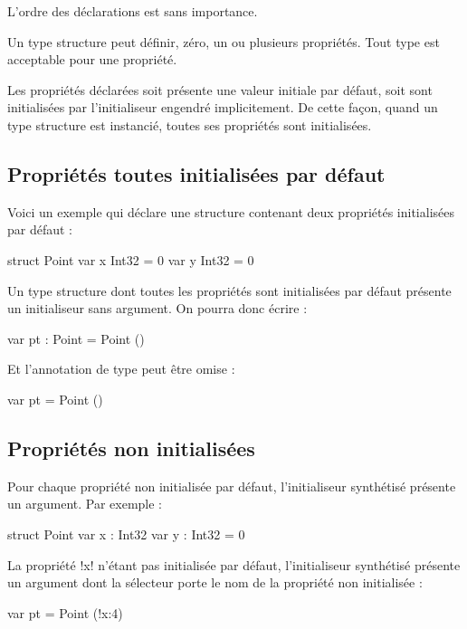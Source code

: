 L'ordre des déclarations est sans importance.











Un type structure peut définir, zéro, un ou plusieurs propriétés. Tout type est acceptable pour une propriété.

Les propriétés déclarées soit présente une valeur initiale par défaut, soit sont initialisées par l'initialiseur engendré implicitement. De cette façon, quand un type structure est instancié, toutes ses propriétés sont initialisées.

\subsection{Propriétés toutes initialisées par défaut}

Voici un exemple qui déclare une structure contenant deux propriétés initialisées par défaut :

\begin{OMNIBUS}
struct Point {
  var x Int32 = 0
  var y Int32 = 0
}
\end{OMNIBUS}

Un type structure dont toutes les propriétés sont initialisées par défaut présente un initialiseur sans argument. On pourra donc écrire :
\begin{OMNIBUS}
var pt : Point = Point ()
\end{OMNIBUS}

Et l'annotation de type peut être omise :
\begin{OMNIBUS}
var pt = Point ()
\end{OMNIBUS}

\subsection{Propriétés non initialisées}

Pour chaque propriété non initialisée par défaut, l'initialiseur synthétisé présente un argument. Par exemple :

\begin{OMNIBUS}
struct Point {
  var x : Int32
  var y : Int32 = 0
}
\end{OMNIBUS}

La propriété \omnibus!x! n'étant pas initialisée par défaut, l'initialiseur synthétisé présente un argument dont la sélecteur porte le nom de la propriété non initialisée :
\begin{OMNIBUS}
var pt = Point (!x:4)
\end{OMNIBUS}

